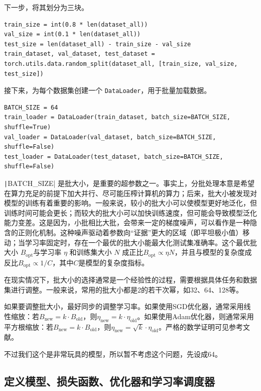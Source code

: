 下一步，将其划分为三块。
\begin{verbatim}
train_size = int(0.8 * len(dataset_all))
val_size = int(0.1 * len(dataset_all))
test_size = len(dataset_all) - train_size - val_size
train_dataset, val_dataset, test_dataset = torch.utils.data.random_split(dataset_all, [train_size, val_size, test_size])
\end{verbatim}

接下来，为每个数据集创建一个 \texttt{DataLoader}，用于批量加载数据。
\begin{verbatim}
BATCH_SIZE = 64
train_loader = DataLoader(train_dataset, batch_size=BATCH_SIZE, shuffle=True)
val_loader = DataLoader(val_dataset, batch_size=BATCH_SIZE, shuffle=False)
test_loader = DataLoader(test_dataset, batch_size=BATCH_SIZE, shuffle=False)
\end{verbatim}
\texttt|BATCH_SIZE| 是批大小，是重要的超参数之一。事实上，分批处理本意是希望在算力充足的前提下加大并行、尽可能压榨计算机的算力；后来，批大小被发现对模型的训练有着重要的影响。一般来说，较小的批大小可以使模型更好地泛化，但训练时间可能会更长；而较大的批大小可以加快训练速度，但可能会导致模型泛化能力变差\cite{keskar2017largebatchtrainingdeeplearning}。这是因为，小批相比大批，会带来一定的梯度噪声，可以看作是一种隐含的正则化机制。这种噪声驱动着参数向“证据”更大的区域（即平坦极小值）移动；当学习率固定时，存在一个最优的批大小能最大化测试集准确率。这个最优批大小 $B_\text{opt}$与学习率 $\eta$ 和训练集大小 $N$ 成正比$B_\text{opt} \propto \eta N$，并且与模型的复杂度成反比$B_\text{opt} \propto 1/C$，其中$C$是模型的复杂度指标\cite{smith2018bayesianperspectivegeneralizationstochastic}。

在现实情况下，批大小的选择通常是一个经验性的过程，需要根据具体任务和数据集进行调整。一般来说，常用的批大小都是2的若干次幂，如32、64、128等。

如果要调整批大小，最好同步的调整学习率。如果使用SGD优化器，通常采用线性缩放：若$B_\text{new} = k \cdot B_\text{old}$，则$\eta_\text{new} = k \cdot \eta_\text{old}$。如果使用Adam优化器，则通常采用平方根缩放：若$B_\text{new} = k \cdot B_\text{old}$，则$\eta_\text{new} = \sqrt{k} \cdot \eta_\text{old}$\cite{malladi2024sdesscalingrulesadaptive}。严格的数学证明可见参考文献。

不过我们这个是非常玩具的模型，所以暂不考虑这个问题，先设成64。

\subsection{定义模型、损失函数、优化器和学习率调度器}

